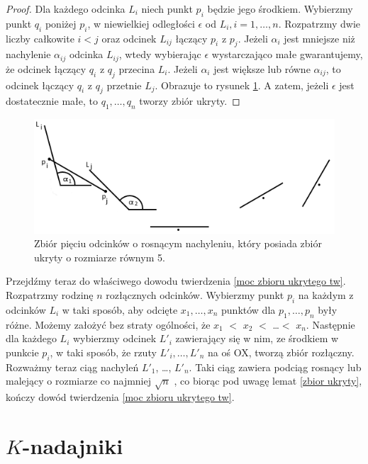 \documentclass[brudnopis]{xmgr}
\theoremstyle{definition}
\begin{document}
\begin{proof}
	Dla każdego odcinka $L_i$ niech punkt $p_i$ będzie jego środkiem. Wybierzmy punkt $q_i$ poniżej $p_i$, w niewielkiej odległości $\epsilon$ od $L_i, i = 1,\ldots,n$. Rozpatrzmy dwie liczby całkowite $i < j$ oraz odcinek $L_{ij}$ łączący $p_i$ z $p_j$. Jeżeli $\alpha_i$ jest mniejsze niż nachylenie $\alpha_{ij}$ odcinka $L_{ij}$, wtedy wybierając $\epsilon$ wystarczająco małe gwarantujemy, że odcinek łączący $q_i$ z $q_j$ przecina $L_i$. Jeżeli $\alpha_i$ jest większe lub równe $\alpha_{ij}$, to odcinek łączący $q_i$ z $q_j$ przetnie $L_j$. Obrazuje to rysunek \ref{fig:5 zbior ukryty}. A zatem, jeżeli $\epsilon$ jest dostatecznie małe, to  $q_1, \ldots, q_n$ tworzy zbiór ukryty. 
\end{proof}
\begin{figure}[ht!]
  \centering
   \includegraphics{rysunki/5_odcinkow_zbior_ukryty.png}
   \caption{Zbiór pięciu odcinków o rosnącym nachyleniu, który posiada zbiór ukryty o rozmiarze równym 5.}
   \label{fig:5 zbior ukryty}
\end{figure}
\indent Przejdźmy teraz do właściwego dowodu twierdzenia \ref{moc zbioru ukrytego tw}. Rozpatrzmy rodzinę $n$ rozłącznych odcinków. Wybierzmy punkt $p_i$ na każdym z odcinków $L_i$ w taki sposób, aby odcięte $x_1,\ldots, x_n$ punktów dla $p_1,\ldots,p_n$ były różne. Możemy założyć bez straty ogólności, że $x_1$ $<$ $x_2$ $<$ \ldots $<$ $x_n$. Następnie dla każdego $L_i$ wybierzmy odcinek $L'_i$ zawierający się w nim, ze środkiem w punkcie $p_i$, w taki sposób, że rzuty $L'_i,\ldots,L'_n$ na oś OX, tworzą zbiór rozłączny. Rozważmy teraz ciąg nachyleń $L'_1$, \ldots, $L'_n$. Taki ciąg zawiera podciąg rosnący lub malejący o rozmiarze co najmniej $\sqrt{n}$ \cite{illumination}, co biorąc pod uwagę lemat \ref{zbior ukryty}, kończy dowód twierdzenia \ref{moc zbioru ukrytego tw}.

\chapter{$K$-nadajniki}
\end{document}
